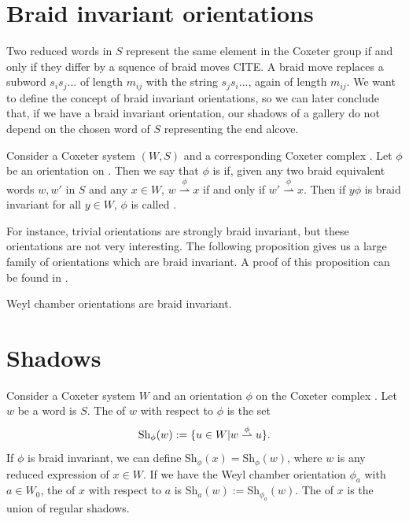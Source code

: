 \documentclass[11pt]{article}
\begin{document}
\section{Braid invariant orientations}

Two reduced words in $S$ represent the same element in the Coxeter group if and only if they differ by a squence of braid moves CITE. A braid move replaces a subword $s_is_j...$ of length $m_{ij}$ with the string $s_js_i...$, again of length $m_{ij}$. We want to define the concept of braid invariant orientations, so we can later conclude that, if we have a braid invariant orientation, our shadows of a gallery do not depend on the chosen word of $S$ representing the end alcove. 

\begin{definition}
    Consider a Coxeter system $(W,S)$ and a corresponding Coxeter complex \sg. Let $\phi$ be an orientation on \sg. Then we say that $\phi$ is  if, given any two braid equivalent words $w,w'$ in $S$ and any $x\in W$, $w\stackrel{\phi}{\rightharpoonup} x$ if and only if $w'\stackrel{\phi}{\rightharpoonup} x$. Then if $y\phi$ is braid invariant for all $y\in W$, $\phi$ is called . 
\end{definition}

For instance, trivial orientations are strongly braid invariant, but these orientations are not very interesting. The following proposition gives us a large family of orientations which are braid invariant. A proof of this proposition can be found in \cite[pp.135-138]{SHA}.

\begin{proposition}
    Weyl chamber orientations are braid invariant.
\end{proposition}


\section{Shadows}
\begin{definition}
    Consider a Coxeter system $W$ and an orientation $\phi$ on the Coxeter complex \sg\W. Let $w$ be a word is $S$. The  of $w$ with respect to $\phi$ is the set 
    \[\textnormal{Sh}_\phi(w):=\{u\in W|w\stackrel{\phi}{\rightharpoonup} u\}.\]
    If $\phi$ is braid invariant, we can define Sh$_\phi(x)=$Sh$_\phi(w)$, where $w$ is any reduced expression of $x\in W$. If we have the Weyl chamber orientation $\phi_a$ with $a\in W_0$, the  of $x$ with respect to $a$ is Sh$_a(w):=$Sh$_{\phi_a}(w)$. The  of $x$ is the union of regular shadows. 
\end{definition}
\end{document}
